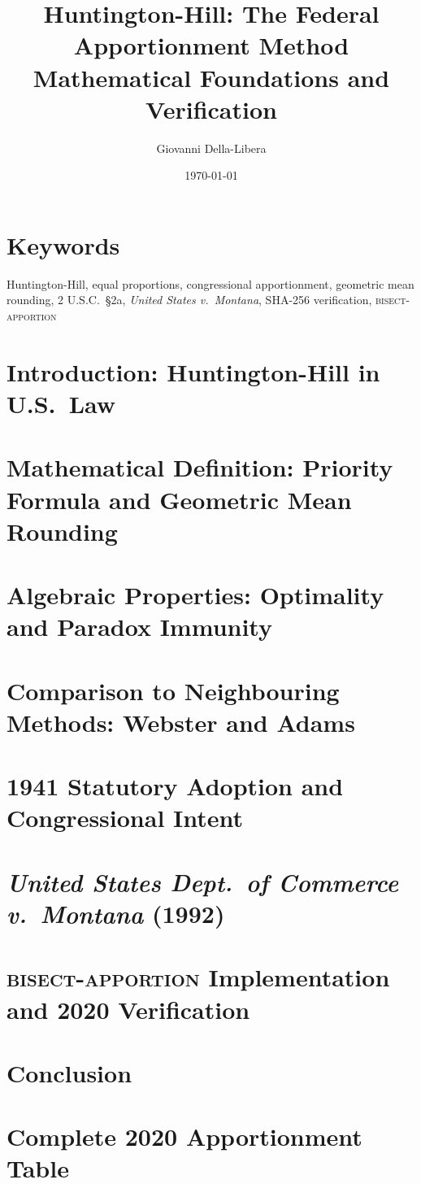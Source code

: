 \documentclass[12pt]{article}
\title{\textbf{Huntington-Hill: The Federal Apportionment Method\\
Mathematical Foundations and Verification}}
\author{Giovanni Della-Libera}
\date{\today}
\begin{document}
\maketitle

\begin{abstract}

\end{abstract}

\section*{Keywords}
Huntington-Hill, equal proportions, congressional apportionment,
geometric mean rounding, 2 U.S.C.\ \S2a,
\textit{United States v.\ Montana}, SHA-256 verification,
\textsc{bisect-apportion}

\section{Introduction: Huntington-Hill in U.S.\ Law}


\section{Mathematical Definition: Priority Formula and Geometric Mean Rounding}


\section{Algebraic Properties: Optimality and Paradox Immunity}


\section{Comparison to Neighbouring Methods: Webster and Adams}


\section{1941 Statutory Adoption and Congressional Intent}


\section{\textit{United States Dept.\ of Commerce v.\ Montana} (1992)}


\section{\textsc{bisect-apportion} Implementation and 2020 Verification}


\section{Conclusion}


\appendix
\section{Complete 2020 Apportionment Table}




\end{document}
